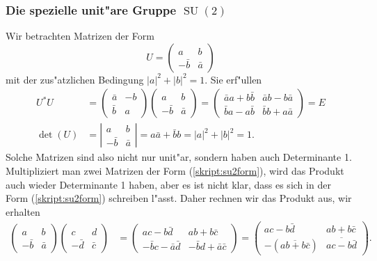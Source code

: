 \subsubsection{Die spezielle unit"are Gruppe $\operatorname{SU}(2)$}
Wir betrachten Matrizen der Form
\begin{equation}
U=
\begin{pmatrix}
a&b\\-\bar b&\bar a
\end{pmatrix}
\label{skript:su2form}
\end{equation}
mit der zus"atzlichen Bedingung $|a|^2 + |b|^2=1$. Sie erf"ullen
\begin{align*}
U^*U
&=
\begin{pmatrix}
\bar a&-b\\\bar b&a
\end{pmatrix}
\begin{pmatrix}
a&b\\-\bar b&\bar a
\end{pmatrix}
=
\begin{pmatrix}
\bar aa+b\bar b & \bar ab-b\bar a\\
\bar ba-a\bar b & \bar bb+a\bar a
\end{pmatrix}
=
E
\\
\det(U)&=\left|
\begin{matrix}
a&b\\-\bar b&\bar a
\end{matrix}
\right|
=
a\bar a+\bar bb = |a|^2 + |b|^2=1.
\end{align*}
Solche Matrizen sind also nicht nur unit"ar, sondern haben auch Determinante 1.
Multipliziert man zwei Matrizen der Form (\ref{skript:su2form}),
wird das Produkt auch wieder Determinante 1 haben, aber es ist nicht klar,
dass es sich in der Form (\ref{skript:su2form}) schreiben l"asst.
Daher rechnen wir das Produkt aus, wir erhalten
\begin{align*}
\begin{pmatrix}  a                        & b                      \\
                 -\bar b                  & \bar a                 \end{pmatrix}
\begin{pmatrix}  c                        & d                      \\
                 -\bar d                  & \bar c                 \end{pmatrix}
&=
\begin{pmatrix}  ac-b\bar d               & ab+b\bar c             \\
                 -\bar bc-\bar a\bar d    & -\bar bd +\bar a\bar c \end{pmatrix}
=
\begin{pmatrix}  ac-b\bar d               & ab+b\bar c             \\
                 -(\overline{ab+b\bar c}) & \overline{ac-b\bar d}  \end{pmatrix}
.
\end{align*}
